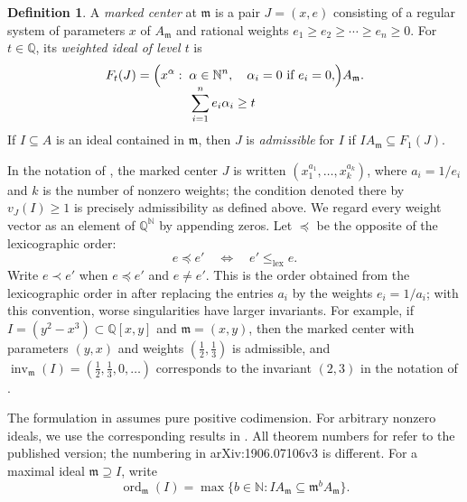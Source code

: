 \documentclass[11pt]{amsart}
\numberwithin{equation}{section}
\theoremstyle{definition}
\newtheorem{definition}[theorem]{Definition}
\newcommand{\Q}{\mathbb{Q}}
\newcommand{\N}{\mathbb{N}}
\newcommand{\fm}{\mathfrak{m}}
\DeclareMathOperator{\inv}{inv}
\DeclareMathOperator{\ord}{ord}
\begin{document}
\begin{definition}\label{def:marked-centre}
A \emph{marked center} at $\fm$ is a pair $J=(x,e)$ consisting of a regular system of parameters $x$ of $A_\fm$ and rational weights $e_1\ge e_2\ge\cdots\ge e_n\ge0$. For $t\in\Q$, its \emph{weighted ideal of level $t$} is
\[
  F_t(J)=\Bigl(x^\alpha:\;
  \begin{aligned}[t]
    &\alpha\in\N^n,\quad \alpha_i=0\text{ if }e_i=0,\\[-2pt]
    &\sum_{i=1}^n e_i\alpha_i\ge t
  \end{aligned}
  \Bigr)A_\fm.
\]
If $I\subseteq A$ is an ideal contained in $\fm$, then $J$ is \emph{admissible} for $I$ if $IA_\fm\subseteq F_1(J)$.
\end{definition}

In the notation of \cite{ATW,Brais}, the marked center $J$ is written $(x_1^{a_1},\ldots,x_k^{a_k})$, where $a_i=1/e_i$ and $k$ is the number of nonzero weights; the condition denoted there by $v_J(I)\ge1$ is precisely admissibility as defined above. We regard every weight vector as an element of $\Q^{\N}$ by appending zeros. Let $\preceq$ be the opposite of the lexicographic order:
\[
  e\preceq e'\quad\Longleftrightarrow\quad e'\le_{\mathrm{lex}} e.
\]
Write $e\prec e'$ when $e\preceq e'$ and $e\ne e'$. This is the order obtained from the lexicographic order in \cite{ATW,Brais} after replacing the entries $a_i$ by the weights $e_i=1/a_i$; with this convention, worse singularities have larger invariants. For example, if $I=(y^2-x^3)\subset\Q[x,y]$ and $\fm=(x,y)$, then the marked center with parameters $(y,x)$ and weights $(\frac12,\frac13)$ is admissible, and $\inv_\fm(I)=(\frac12,\frac13,0,\ldots)$ corresponds to the invariant $(2,3)$ in the notation of \cite{ATW}.

The formulation in \cite[Sections~3--4]{Brais} assumes pure positive codimension. For arbitrary nonzero ideals, we use the corresponding results in \cite[Sections~5--6]{ATW}. All theorem numbers for \cite{ATW} refer to the published version; the numbering in arXiv:1906.07106v3 is different. For a maximal ideal $\fm\supseteq I$, write
\[
  \ord_\fm(I)=\max\{b\in\N:IA_\fm\subseteq\fm^bA_\fm\}.
\]
\end{document}
